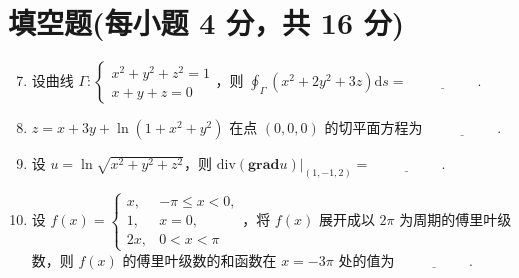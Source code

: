 \documentclass[../Main.tex]{subfiles}
\begin{document}
\section{填空题(每小题 4 分，共 16 分)}
\begin{enumerate}
  \setcounter{enumi}{6}
  \item 设曲线 \( \Gamma: \begin{cases} x^2 + y^2 + z^2 = 1 \\ x + y + z = 0 \end{cases} \)，则 \( \displaystyle \oint_{\Gamma} (x^2 + 2y^2 + 3z) \mathrm{d}s = \underline{\hspace{5em}} \).

  \item \( z = x + 3y + \ln(1 + x^2 + y^2) \) 在点 \( (0,0,0) \) 的切平面方程为 \(\underline{\hspace{5em}}\).

  \item 设 \( u = \ln \sqrt{x^2 + y^2 + z^2} \)，则 \( \text{div}(\textbf{grad}u) \Big|_{(1,-1,2)} = \underline{\hspace{5em}} \).

  \item 设 \( f(x) = \begin{cases} x, & -\pi \leq x < 0, \\ 1, & x = 0, \\ 2x, & 0 < x < \pi \end{cases} \)，将 \( f(x) \) 展开成以 \( 2\pi \) 为周期的傅里叶级数，则 \( f(x) \) 的傅里叶级数的和函数在 \( x = -3\pi \) 处的值为 \(\underline{\hspace{5em}}\).

\end{enumerate}
\end{document}
